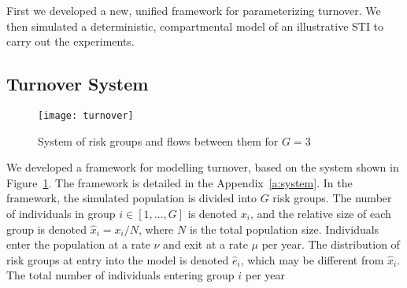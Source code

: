 First we developed a new, unified framework for parameterizing turnover. 
We then simulated a deterministic, compartmental model of
an illustrative STI to carry out the experiments.
\subsection{Turnover System}
\label{ss:system}
\begin{figure}
  \centering
  \texttt{[image: turnover]}
  \caption{System of risk groups and flows between them for $G = 3$}
  \label{fig:system}
\end{figure}
We developed a framework for modelling turnover,
based on the system shown in Figure~\ref{fig:system}.
The framework is detailed in the Appendix~\ref{a:system}.		%
In the framework, the simulated population is divided into $G$ risk groups.
The number of individuals in group $i \in [1, \dots, G]$ is denoted $x_i$,
and the relative size of each group is denoted $\hat{x}_i = x_i / N$,
where $N$ is the total population size.
Individuals enter the population at a rate $\nu$ and exit at a rate $\mu$ per year.
The distribution of risk groups at entry into the model
is denoted $\hat{e}_i$, which may be different from $\hat{x}_i$.
The total number of individuals entering group $i$ per year
